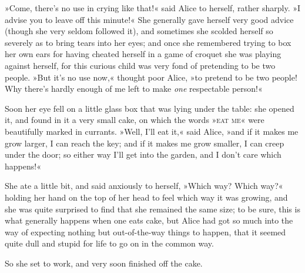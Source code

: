 »Come, there's no use in crying like that!« said Alice to herself, rather sharply. »I advise you to leave off this minute!« She generally gave herself very good advice (though she very seldom followed it), and sometimes she scolded herself so severely as to bring tears into her eyes; and once she remembered trying to box her own ears for having cheated herself in a game of croquet she was playing against herself, for this curious child was very fond of pretending to be two people. »But it's no use now,« thought poor Alice, »to pretend to be two people! Why there's hardly enough of me left to make \textit{one} respectable person!«

Soon her eye fell on a little glass box that was lying under the table: she opened it, and found in it a very small cake, on which the words »\textsc{eat me}« were beautifully marked in currants. »Well, I'll eat it,« said Alice, »and if it makes me grow larger, I can reach the key; and if it makes me grow smaller, I can creep under the door; so either way I'll get into the garden, and I don't care which happens!«

She ate a little bit, and said anxiously to herself, »Which way? Which way?« holding her hand on the top of her head to feel which way it was growing, and she was quite surprised to find that she remained the same size; to be sure, this is what generally happens when one eats cake, but Alice had got so much into the way of expecting nothing but out-of-the-way things to happen, that it seemed quite dull and stupid for life to go on in the common way.

So she set to work, and very soon finished off the cake.